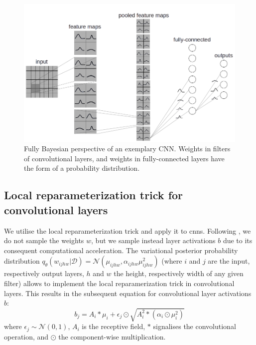 %
\begin{figure}[b!] 
\begin{center}
\includegraphics[width=\linewidth]{Chapter4/Figs/CNNwithdist_grey.png}
\caption{Fully Bayesian perspective of an exemplary CNN. Weights in filters of convolutional layers, and weights in fully-connected layers have the form of a probability distribution.}
\label{fig:CNNwithdist_grey}
\end{center}
\end{figure} 
%
\subsection{Local reparameterization trick for convolutional layers}
We utilise the local reparameterization trick \cite{kingma2015variational} and apply it to \acp{cnn}. Following \cite{kingma2015variational,neklyudov2018variance}, we do not sample the weights $w$, but we sample instead layer activations $b$ due to its consequent computational acceleration. The variational posterior probability distribution $q_{\theta}(w_{ijhw}|\mathcal{D})=\mathcal{N}(\mu_{ijhw},\alpha_{ijhw}\mu^2_{ijhw})$ (where $i$ and $j$ are the input, respectively output layers, $h$ and $w$ the height, respectively width of any given filter) allows to implement the local reparamerization trick in convolutional layers. This results in the subsequent equation for convolutional layer activations $b$:
\begin{equation}
    b_j=A_i\ast \mu_i+\epsilon_j\odot \sqrt{A^2_i\ast (\alpha_i\odot \mu^2_i)}
\end{equation}
where $\epsilon_j \sim \mathcal{N}(0,1)$, $A_i$ is the receptive field, $\ast$ signalises the convolutional operation, and $\odot$ the component-wise multiplication.

